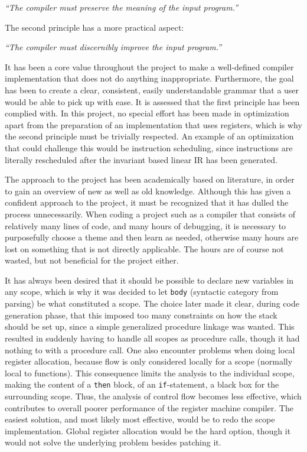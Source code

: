 \begin{displayquote}
    \textit{``The compiler must preserve the meaning of the input program.''}
\end{displayquote}
\hspace*{}

The second principle has a more practical aspect:

\begin{displayquote}
    \textit{``The compiler must discernibly improve the input program.''}
\end{displayquote}
\hspace*{}

It has been a core value throughout the project to make a well-defined compiler implementation that does not do anything inappropriate. Furthermore, the goal has been to create a clear, consistent, easily understandable grammar that a user would be able to pick up with ease. It is assessed that the first principle has been complied with. In this project, no special effort has been made in optimization apart from the preparation of an implementation that uses registers, which is why the second principle must be trivially respected. An example of an optimization that could challenge this would be instruction scheduling, since instructions are literally rescheduled after the invariant based linear IR has been generated.

The approach to the project has been academically based on literature, in order to gain an overview of new as well as old knowledge. Although this has given a confident approach to the project, it must be recognized that it has dulled the process unnecessarily. When coding a project such as a compiler that consists of relatively many lines of code, and many hours of debugging, it is necessary to purposefully choose a theme and then learn as needed, otherwise many hours are lost on something that is not directly applicable. The hours are of course not wasted, but not beneficial for the project either.

It has always been desired that it should be possible to declare new variables in any scope, which is why it was decided to let \texttt{body} (syntactic category from parsing) be what constituted a scope. The choice later made it clear, during code generation phase, that this imposed too many constraints on how the stack should be set up, since a simple generalized procedure linkage was wanted. This resulted in suddenly having to handle all scopes as procedure calls, though it had nothing to with a procedure call. One also encounter problems when doing local register allocation, because flow is only considered locally for a scope (normally local to functions). This consequence limits the analysis to the individual scope, making the content of a \texttt{then} block, of an \texttt{if}-statement, a black box for the surrounding scope. Thus, the analysis of control flow becomes less effective, which contributes to overall poorer performance of the register machine compiler. The easiest solution, and most likely most effective, would be to redo the scope implementation. Global register allocation would be the hard option, though it would not solve the underlying problem besides patching it.

